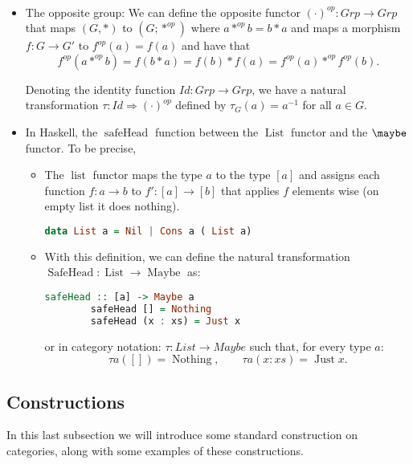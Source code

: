 \begin{example}\ 
  \begin{itemize}
  \item The opposite group: We can define the opposite functor $(\cdot)^{op}: Grp \to Grp$ that maps $(G, *)$ to $(G; *^{op})$ where $a*^{op}b= b*a$ and maps a morphism $f: G \to G'$ to $f^{op}(a) = f(a)$ and have that
    $$ f^{op}(a*^{op}b) = f(b*a) = f(b)*f(a) = f^{op}(a) *^{op} f^{op}(b).$$

    Denoting the identity function $Id:Grp\to Grp$, we have a natural transformation $\tau:Id \Rightarrow (\cdot)^{op}$ defined by $\tau_G(a)=a^{-1}$ for all $a\in G$.
    
  \item In Haskell, the $\operatorname{safeHead}$ \cite[Section 10.1]{milewski2018category} function between the $\operatorname{List}$ functor and the $\maybe$ functor. To be precise, 
    \begin{itemize}
    \item The $\operatorname{list}$ functor maps the type $a$ to the type $[a]$ and assigns each function $f:a\to b$ to $f':[a]\to [b]$ that applies $f$ elements wise (on empty list it does nothing).
      \begin{lstlisting}[language=Haskell,captionpos=b]
        data List a = Nil | Cons a ( List a)
      \end{lstlisting}
    \item  With this definition, we can define the natural transformation $\operatorname{SafeHead}: \operatorname{List} \to \operatorname{Maybe}$ as:
      \begin{lstlisting}[language=Haskell,captionpos=b]
        safeHead :: [a] -> Maybe a
        safeHead [] = Nothing
        safeHead (x : xs) = Just x
      \end{lstlisting}

      or in category notation:  $\tau : List \to Maybe$ such that, for every type $a$:
      $$\tau a ([]) = \operatorname{Nothing}, \qquad \tau a (x:xs) = \operatorname{Just} x.$$ 
    \end{itemize}
  \end{itemize}
\end{example}


\subsection{Constructions}
In this last subsection we will introduce some standard construction on categories, along with some examples of these constructions.


